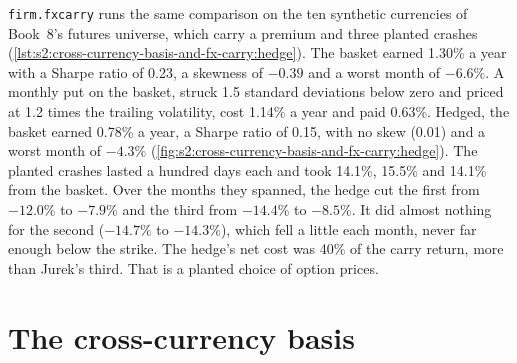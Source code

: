 \texttt{firm.fxcarry} runs the same comparison on the ten synthetic currencies of Book~8's futures universe, which carry a premium and three planted
crashes (\cref{lst:s2:cross-currency-basis-and-fx-carry:hedge}). The basket earned 1.30\% a year with a Sharpe ratio of 0.23, a skewness of $-0.39$ and
a worst month of $-6.6\%$. A monthly put on the basket, struck 1.5 standard deviations below zero and priced at 1.2 times the trailing volatility, cost
1.14\% a year and paid 0.63\%. Hedged, the basket earned 0.78\% a year, a Sharpe ratio of 0.15, with no skew (0.01) and a worst month of $-4.3\%$
(\cref{fig:s2:cross-currency-basis-and-fx-carry:hedge}). The planted crashes lasted a hundred days each and took 14.1\%, 15.5\% and 14.1\% from the
basket. Over the months they spanned, the hedge cut the first from $-12.0\%$ to $-7.9\%$ and the third from $-14.4\%$ to $-8.5\%$. It did almost
nothing for the second ($-14.7\%$ to $-14.3\%$), which fell a little each month, never far enough below the strike. The hedge's net cost was 40\% of
the carry return, more than Jurek's third. That is a planted choice of option prices.

\begin{omfigure}

\label{fig:s2:cross-currency-basis-and-fx-carry:hedge}
\end{omfigure}

\section{The cross-currency basis}

